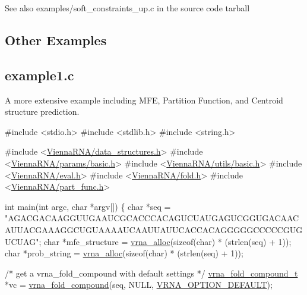  \begin{DoxySeeAlso}{See also}
{\ttfamily examples/soft\+\_\+constraints\+\_\+up.\+c} in the source code tarball
\end{DoxySeeAlso}
\hypertarget{examples_c_ex_c_other}{}\subsection{Other Examples}\label{examples_c_ex_c_other}
\subsection*{example1.\+c }

A more extensive example including M\+FE, Partition Function, and Centroid structure prediction.


\begin{DoxyCodeInclude}
\textcolor{preprocessor}{#include <stdio.h>}
\textcolor{preprocessor}{#include <stdlib.h>}
\textcolor{preprocessor}{#include <string.h>}

\textcolor{preprocessor}{#include  <\hyperlink{data__structures_8h}{ViennaRNA/data\_structures.h}>}
\textcolor{preprocessor}{#include  <\hyperlink{params_2basic_8h}{ViennaRNA/params/basic.h}>}
\textcolor{preprocessor}{#include  <\hyperlink{utils_2basic_8h}{ViennaRNA/utils/basic.h}>}
\textcolor{preprocessor}{#include  <\hyperlink{eval_8h}{ViennaRNA/eval.h}>}
\textcolor{preprocessor}{#include  <\hyperlink{fold_8h}{ViennaRNA/fold.h}>}
\textcolor{preprocessor}{#include  <\hyperlink{part__func_8h}{ViennaRNA/part\_func.h}>}


\textcolor{keywordtype}{int}
main(\textcolor{keywordtype}{int}  argc,
     \textcolor{keywordtype}{char} *argv[])
\{
  \textcolor{keywordtype}{char}                  *seq =
    \textcolor{stringliteral}{"AGACGACAAGGUUGAAUCGCACCCACAGUCUAUGAGUCGGUGACAACAUUACGAAAGGCUGUAAAAUCAAUUAUUCACCACAGGGGGCCCCCGUGUCUAG"};
  \textcolor{keywordtype}{char}                  *mfe\_structure  = \hyperlink{group__utils_gaf37a0979367c977edfb9da6614eebe99}{vrna\_alloc}(\textcolor{keyword}{sizeof}(\textcolor{keywordtype}{char}) * (strlen(seq) + 1));
  \textcolor{keywordtype}{char}                  *prob\_string    = \hyperlink{group__utils_gaf37a0979367c977edfb9da6614eebe99}{vrna\_alloc}(\textcolor{keyword}{sizeof}(\textcolor{keywordtype}{char}) * (strlen(seq) + 1));

  \textcolor{comment}{/* get a vrna\_fold\_compound with default settings */}
  \hyperlink{group__fold__compound_structvrna__fc__s}{vrna\_fold\_compound\_t}  *vc = \hyperlink{group__fold__compound_ga6601d994ba32b11511b36f68b08403be}{vrna\_fold\_compound}(seq, NULL, 
      \hyperlink{group__fold__compound_gacea5b7ee6181c485f36e2afa0e9089e4}{VRNA\_OPTION\_DEFAULT});


\end{DoxyCodeInclude}
